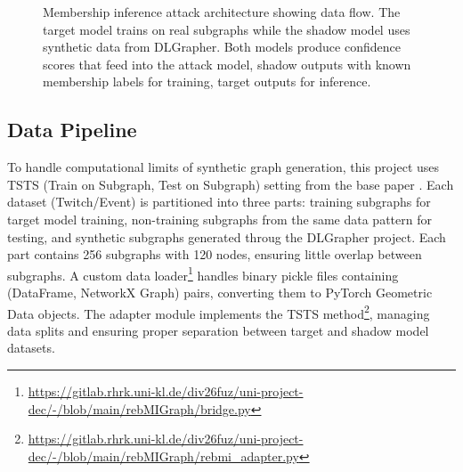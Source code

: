 \documentclass{article}
\begin{document}
\begin{figure}[H]
\caption{Membership inference attack architecture showing data flow. The target model trains on real subgraphs while the shadow model uses synthetic data from DLGrapher. Both models produce confidence scores that feed into the attack model, shadow outputs with known membership labels for training, target outputs for inference.}
\label{fig:attack-architecture}
\end{figure}

\subsection{Data Pipeline}
To handle computational limits of synthetic graph generation, this project uses TSTS (Train on Subgraph, Test on Subgraph) setting from the base paper \cite{olatunji2021membershipinferenceattackgraph}. Each dataset (Twitch/Event) is partitioned into three parts: training subgraphs for target model training, non-training subgraphs from the same data pattern for testing, and synthetic subgraphs generated throug the DLGrapher project\cite{dlgrapher2022}. Each part contains 256 subgraphs with 120 nodes, ensuring little overlap between subgraphs. A custom data loader\footnote{\url{https://gitlab.rhrk.uni-kl.de/div26fuz/uni-project-dec/-/blob/main/rebMIGraph/bridge.py}} handles binary pickle files containing (DataFrame, NetworkX Graph) pairs, converting them to PyTorch Geometric Data objects. The adapter module implements the TSTS method\footnote{\url{https://gitlab.rhrk.uni-kl.de/div26fuz/uni-project-dec/-/blob/main/rebMIGraph/rebmi_adapter.py}}, managing data splits and ensuring proper separation between target and shadow model datasets.
\end{document}
